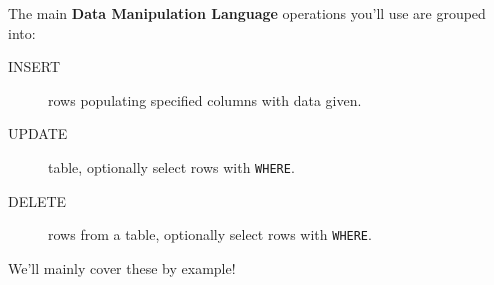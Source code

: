 \documentclass[slides]{pgnotes}
\begin{document}
The main \textbf{Data Manipulation Language} operations you'll use are grouped into:

\begin{description}
\item[INSERT]
  rows populating specified columns with data given.
\item[UPDATE]
  table, optionally select rows with \texttt{WHERE}.
\item[DELETE]
  rows from a table, optionally select rows with \texttt{WHERE}.
\end{description}

We'll mainly cover these by example!
\end{document}
